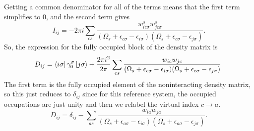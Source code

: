 \documentclass[12pt]{caltech_thesis}
\begin{document}
Getting a common denominator for all of the terms means that the first term simplifies to 0, and the second term gives
\begin{equation}
I_{ij} = -2\pi i \sum_{cs}\frac{w_{i c \sigma}^s w_{j c \sigma}^s}{(\Omega_s + \epsilon_{c \sigma} - \epsilon_{i \sigma})(\Omega_s + \epsilon_{c \sigma} - \epsilon_{j \sigma})}.
\end{equation}
So, the expression for the fully occupied block of the density matrix is
\begin{equation}
D_{ij} = \bra{i\sigma } \gamma _0^\sigma \ket{j\sigma } + \frac{2\pi i^2}{2\pi} \sum_{cs}\frac{w_{ic} w_{jc}}{(\Omega_s + \epsilon_{c \sigma} - \epsilon_{i \sigma})(\Omega_s + \epsilon_{c \sigma} - \epsilon_{j \sigma})}.
\end{equation}
The first term is the fully occupied element of the noninteracting density matrix, so this just reduces to $\delta _{ij}$ since for this reference system, the occupied occupations are just unity and then we relabel the virtual index $c\rightarrow a$.
\begin{equation}
D_{ij} = \delta _{ij} - \sum_{as}\frac{w_{ia} w_{ja}}{(\Omega_s + \epsilon_{a \sigma} - \epsilon_{i \sigma})(\Omega_s + \epsilon_{a \sigma} - \epsilon_{j \sigma})}.
\end{equation}
\end{document}
